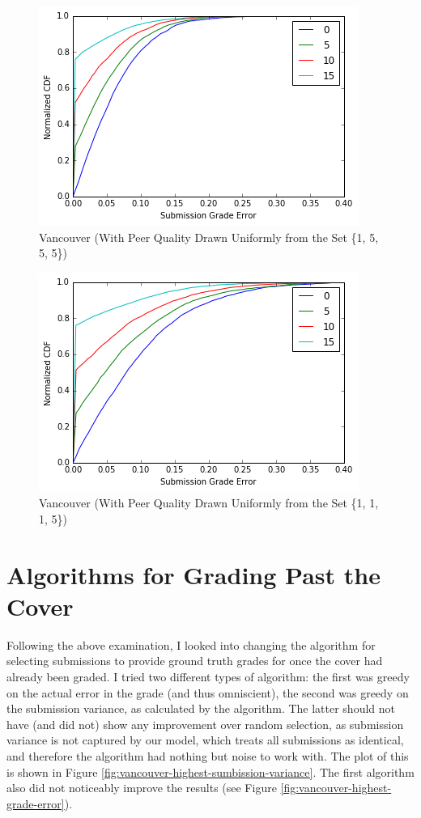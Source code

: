 \documentclass{article}
\begin{document}
	\begin{figure}[h]
		\includegraphics{vancouver-skewed.png}
		\caption{Vancouver (With Peer Quality Drawn Uniformly from the Set \{1, 5, 5, 5\})}
		\label{fig:vancouver-skewed}
	\end{figure}
	
	\begin{figure}[h]
		\includegraphics{vancouver-skewed-low.png}
		\caption{Vancouver (With Peer Quality Drawn Uniformly from the Set \{1, 1, 1, 5\})}
		\label{fig:vancouver-skewed-low}
	\end{figure}
	
	
	\section{Algorithms for Grading Past the Cover}
	Following the above examination, I looked into changing the algorithm for selecting submissions to provide ground truth grades for once the cover had already been graded. I tried two different types of algorithm: the first was greedy on the actual error in the grade (and thus omniscient), the second was greedy on the submission variance, as calculated by the algorithm. The latter should not have (and did not) show any improvement over random selection, as submission variance is not captured by our model, which treats all submissions as identical, and therefore the algorithm had nothing but noise to work with. The plot of this is shown in Figure \ref{fig:vancouver-highest-sumbission-variance}. The first algorithm also did not noticeably improve the results (see Figure \ref{fig:vancouver-highest-grade-error}).
	
\end{document}
